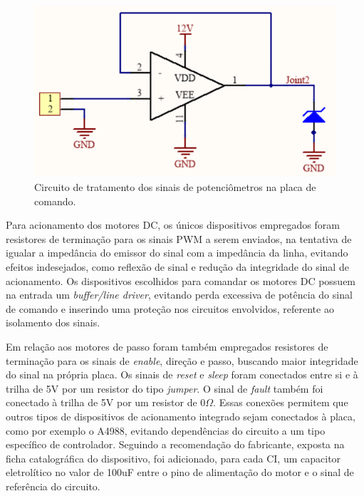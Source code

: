 \begin{figure}[h]
    \caption{Circuito de tratamento dos sinais de potenciômetros na placa de comando.}    
    \begin{centering}

        \includegraphics[width=0.6\columnwidth]{images/pcbs/MainPCB-Pot.png}
    
    \par\end{centering}

    \label{fig:MainPCB-Pot}
\end{figure}

Para acionamento dos motores DC, os únicos dispositivos empregados foram
resistores de terminação para os sinais PWM a serem enviados, na tentativa de igualar
a impedância do emissor do sinal com a impedância da linha, 
evitando efeitos indesejados, como reflexão de sinal e redução
da integridade do sinal de acionamento. Os dispositivos escolhidos para
comandar os motores DC possuem na entrada um \textit{buffer/line driver},
evitando perda excessiva de potência do sinal de comando e inserindo uma 
proteção nos circuitos envolvidos, referente ao isolamento dos sinais.

Em relação aos motores de passo foram também empregados resistores de 
terminação para os sinais de \textit{enable}, direção e passo, buscando 
maior integridade do sinal na própria placa. Os sinais de \textit{reset}
e \textit{sleep} foram conectados entre si e à trilha de 5V por um 
resistor do tipo \textit{jumper}. O sinal de \textit{fault} também 
foi conectado à trilha de 5V por um resistor de $0\Omega$. Essas conexões
permitem que outros tipos de dispositivos de acionamento integrado sejam conectados à placa,
como por exemplo o A4988, evitando dependências do circuito a um tipo específico de
controlador. 
Seguindo a recomendação do fabricante, exposta na ficha catalográfica do dispositivo, 
foi adicionado, para cada CI, um capacitor eletrolítico no valor
de 100uF entre o pino de alimentação do motor e o sinal de referência
do circuito.   

